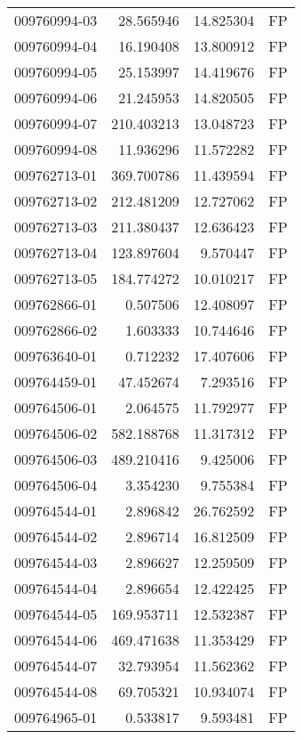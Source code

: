 \begin{tabular}{lrrl}
009760994-03 &   28.565946 &      14.825304 &   FP \\
009760994-04 &   16.190408 &      13.800912 &   FP \\
009760994-05 &   25.153997 &      14.419676 &   FP \\
009760994-06 &   21.245953 &      14.820505 &   FP \\
009760994-07 &  210.403213 &      13.048723 &   FP \\
009760994-08 &   11.936296 &      11.572282 &   FP \\
009762713-01 &  369.700786 &      11.439594 &   FP \\
009762713-02 &  212.481209 &      12.727062 &   FP \\
009762713-03 &  211.380437 &      12.636423 &   FP \\
009762713-04 &  123.897604 &       9.570447 &   FP \\
009762713-05 &  184.774272 &      10.010217 &   FP \\
009762866-01 &    0.507506 &      12.408097 &   FP \\
009762866-02 &    1.603333 &      10.744646 &   FP \\
009763640-01 &    0.712232 &      17.407606 &   FP \\
009764459-01 &   47.452674 &       7.293516 &   FP \\
009764506-01 &    2.064575 &      11.792977 &   FP \\
009764506-02 &  582.188768 &      11.317312 &   FP \\
009764506-03 &  489.210416 &       9.425006 &   FP \\
009764506-04 &    3.354230 &       9.755384 &   FP \\
009764544-01 &    2.896842 &      26.762592 &   FP \\
009764544-02 &    2.896714 &      16.812509 &   FP \\
009764544-03 &    2.896627 &      12.259509 &   FP \\
009764544-04 &    2.896654 &      12.422425 &   FP \\
009764544-05 &  169.953711 &      12.532387 &   FP \\
009764544-06 &  469.471638 &      11.353429 &   FP \\
009764544-07 &   32.793954 &      11.562362 &   FP \\
009764544-08 &   69.705321 &      10.934074 &   FP \\
009764965-01 &    0.533817 &       9.593481 &   FP \\

\end{tabular}
